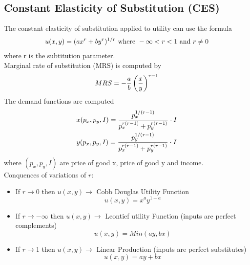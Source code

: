 \documentclass[a4paper, 12pt, reqno]{article}
\begin{document}
\subsection{Constant Elasticity of Substitution (CES)}
The constant elasticity of substitution applied to utility can use the formula
\begin{equation}
    u(x,y) = (ax^{r}+by^{r})^{1/r} \mbox{ where } -\infty <r<1 \mbox{ and } r\neq 0
    \notag
\end{equation}
where r is the subtitution parameter. \\
Marginal rate of substitution (MRS) is computed by
\begin{equation}
    MRS = -\frac{a}{b} \left( \frac{x}{y}\right) ^{r-1}
    \notag
\end{equation}  
The demand functions are computed
\begin{equation}
\begin{split}    
&x(p_x,p_y,I) = \frac{p_{x}^{1/(r-1)}}{p_{x}^{r(r-1)}+p_{y}^{r(r-1)}}\cdot I \\
&y(p_x,p_y,I) = \frac{p_{y}^{1/(r-1)}}{p_{x}^{r(r-1)}+p_{y}^{r(r-1)}}\cdot I
\notag 
\end{split}   
\end{equation} 
where $(p_x,p_y,I)$ are price of good x, price of good y and income. \\
Conquences of variations of $r$:
\begin{itemize}
    \item If $ r \rightarrow 0$ then $u(x,y) \rightarrow$ Cobb Douglas Utility Function $$ u(x,y) = x^{a}y^{1-a}$$
    \item If $ r \rightarrow - \infty $ then $u(x,y) \rightarrow$ Leontief utility Function (inputs are perfect complements) $$ u(x,y) = Min(ay, bx)$$
    \item If $ r \rightarrow 1 $ then $u(x,y) \rightarrow$ Linear Production (inputs are perfect substitutes) $$ u(x,y) = ay + bx$$
\end{itemize} 
\end{document}
